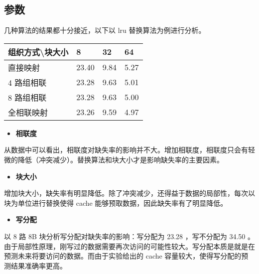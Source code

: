 \documentclass{article}
\newlength\tablewidth
\begin{document}
\subsection{参数}




几种算法的结果都十分接近，以下以 lru 替换算法为例进行分析。


\begin{center}
\setlength\tablewidth{\dimexpr (\textwidth -8\tabcolsep)}
\begin{tabular}{|p{0.345\tablewidth}<{\centering}|p{0.241\tablewidth}<{\centering}|p{0.207\tablewidth}<{\centering}|p{0.207\tablewidth}<{\centering}|}
\hline
\rowcolor{tabletopgray}
\textbf{ 组织方式\textbackslash{}块大小 }&\textbf{ 8     }&\textbf{ 32   }&\textbf{ 64   }\\
\hline
 直接映射        & 23.40 & 9.84 & 5.27 \\
\hline
 4 路组相联      & 23.28 & 9.63 & 5.01 \\
\hline
 8 路组相联      & 23.28 & 9.63 & 5.00 \\
\hline
 全相联映射      & 23.26 & 9.59 & 4.97 \\
\hline
\end{tabular}
\end{center}



\begin{itemize}
\item
\textbf{相联度}
\end{itemize}



从数据中可以看出，相联度对缺失率的影响并不大。增加相联度，相联度只会有轻微的降低（冲突减少）。替换算法和块大小才是影响缺失率的主要因素。


\begin{itemize}
\item
\textbf{块大小}
\end{itemize}



增加块大小，缺失率有明显降低。除了冲突减少，还得益于数据的局部性，每次以块为单位进行替换使得 cache 能够预取数据，因此缺失率有了明显降低。


\begin{itemize}
\item
\textbf{写分配}
\end{itemize}



以 8 路 8B 块分析写分配对缺失率的影响：写分配为 23.28 ，写不分配为 34.50 。由于局部性原理，刚写过的数据需要再次访问的可能性较大。写分配本质是就是在预测未来将要访问的数据。而由于实验给出的 cache 容量较大，使得写分配的预测结果准确率更高。
\end{document}

